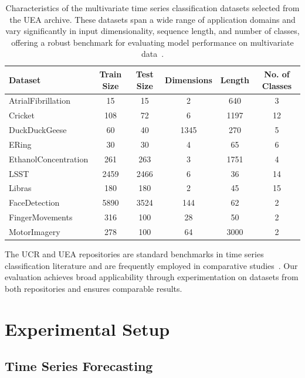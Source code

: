\begin{table}[h!]
\centering
\begin{adjustbox}{max width=\textwidth}
\begin{tabular}{lccccc}
\toprule
\textbf{Dataset} & \textbf{Train Size} & \textbf{Test Size} & \textbf{Dimensions} & \textbf{Length} & \textbf{No. of Classes} \\
\midrule
AtrialFibrillation & 15 & 15 & 2 & 640 & 3 \\
Cricket & 108 & 72 & 6 & 1197 & 12 \\
DuckDuckGeese & 60 & 40 & 1345 & 270 & 5 \\
ERing & 30 & 30 & 4 & 65 & 6 \\
EthanolConcentration & 261 & 263 & 3 & 1751 & 4 \\
LSST & 2459 & 2466 & 6 & 36 & 14 \\
Libras & 180 & 180 & 2 & 45 & 15 \\
FaceDetection & 5890 & 3524 & 144 & 62 & 2 \\
FingerMovements & 316 & 100 & 28 & 50 & 2 \\
MotorImagery & 278 & 100 & 64 & 3000 & 2 \\
\bottomrule
\end{tabular}
\end{adjustbox}
\caption{Characteristics of the multivariate time series classification datasets selected from the UEA archive. These datasets span a wide range of application domains and vary significantly in input dimensionality, sequence length, and number of classes, offering a robust benchmark for evaluating model performance on multivariate data~\cite{bagnall2018ueamultivariatetimeseries}.}
\label{tab:tsc_multivariate}
\end{table}

The UCR and UEA repositories are standard benchmarks in time series classification literature and are frequently employed in comparative studies~\cite{UCRArchive2018, bagnall2018ueamultivariatetimeseries}. Our evaluation achieves broad applicability through experimentation on datasets from both repositories and ensures comparable results. 


\section{Experimental Setup} \label{sec:experimental_setup}

\subsection*{Time Series Forecasting} \label{subsec:experimental_setup-tsf}


